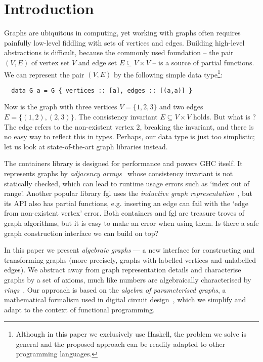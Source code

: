 \section{Introduction}\label{sec-intro}

Graphs are ubiquitous in computing, yet working with graphs often requires
painfully low-level fiddling with sets of vertices and edges. Building high-level
abstractions is difficult, because the commonly used foundation -- the pair $(V, E)$
of vertex set $V$ and edge set $E \subseteq V \times V$ -- is a source of partial
functions. We can represent the pair $(V, E)$ by the following simple data
type\footnote{Although in this paper we exclusively use Haskell, the problem we solve is
general and the proposed approach can be readily adapted to other programming languages.}:

\vspace{0.5mm}
\begin{verbatim}
  data G a = G { vertices :: [a], edges :: [(a,a)] }
\end{verbatim}
\vspace{0.5mm}

\noindent
Now  is the graph with three vertices $V = \{1,2,3\}$ and
two edges $E = \{(1,2), (2,3)\}$. The consistency invariant $E \subseteq V \times V$ holds.
But what is ? The edge refers to the non-existent vertex $2$, breaking the
invariant, and there is no easy way to reflect this in types. Perhaps, our data type is just
too simplistic; let us look at state-of-the-art graph libraries instead.

The \textsf{containers} library is designed for performance and powers GHC itself.
It represents graphs by \emph{adjacency arrays}~\cite{1995_king_graphs} whose
consistency invariant is not statically checked, which can lead to runtime
usage errors such as \textsf{`index out of range'}. Another popular library \textsf{fgl} uses
the \emph{inductive graph representation}~\cite{2001_erwig_inductive}, but its API also
has partial functions, e.g. inserting an edge can fail with the \textsf{`edge from
non-existent vertex'} error.
Both \textsf{containers} and \textsf{fgl} are treasure troves of graph algorithms,
but it is easy to make an error when using them. Is there a safe graph construction
interface we can build on top?

In this paper we present \emph{algebraic graphs} --- a new interface for constructing
and transforming graphs (more precisely, graphs with labelled vertices and unlabelled
edges). We abstract away from graph representation details and characterise graphs by a
set of axioms, much like numbers are algebraically characterised by
\emph{rings}~\cite{1999_maclane_algebra}. Our approach is based on the
\emph{algebra of parameterised graphs}, a mathematical formalism used in digital
circuit design~\cite{2014_algebra_mokhov}, which we simplify and adapt to the
context of functional programming.

